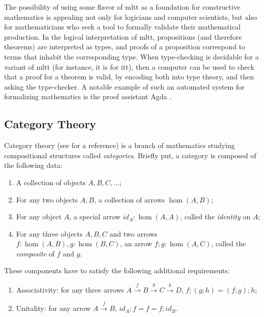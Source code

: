 \documentclass[a4paper]{article}
\begin{document}
The possibility of using some flavor of \gls{mltt} as a foundation for constructive mathematics is appealing not only for logicians and computer scientists, but also for mathematicians who seek a tool to formally validate their mathematical production. In the logical interpretation of \gls{mltt}, propositions (and therefore theorems) are interpreted as types, and proofs of a proposition correspond to terms that inhabit the corresponding type. When type-checking is decidable for a variant of \gls{mltt} (for instance, it is for \gls{itt}), then a computer can be used to check that a proof for a theorem is valid, by encoding both into type theory, and then asking the type-checker. A notable example of such an automated system for formalizing mathematics is the proof assistant Agda \cite{Norell2009}.

\subsection{Category Theory}

Category theory (see \cite{Riehl2017} for a reference) is a branch of mathematics studying compositional structures called \textit{categories}. Briefly put, a category is composed of the following data:

\begin{enumerate}
	\item A collection of objects \(A, B, C, ...\);
	\item For any two objects \(A, B\), a collection of arrows \(\hom(A, B)\);
	\item For any object \(A\), a special arrow \(id_A : \hom(A, A)\), called the \textit{identity} on \(A\);
	\item For any three objects \(A, B, C\) and two arrows \(f : \hom(A, B), g : \hom(B, C)\), an arrow \(f ; g : \hom(A, C)\), called the \textit{composite} of \(f\) and \(g\).
\end{enumerate}

These components have to satisfy the following additional requirements:

\begin{enumerate}
	\item Associativity: for any three arrows \(A \xrightarrow{f} B \xrightarrow{g} C \xrightarrow{h} D\), \(f ; (g ; h) = (f ; g) ; h\);
	\item Unitality: for any arrow \(A \xrightarrow{f} B\), \(id_A ; f = f = f ; id_B\).
\end{enumerate}
\end{document}
